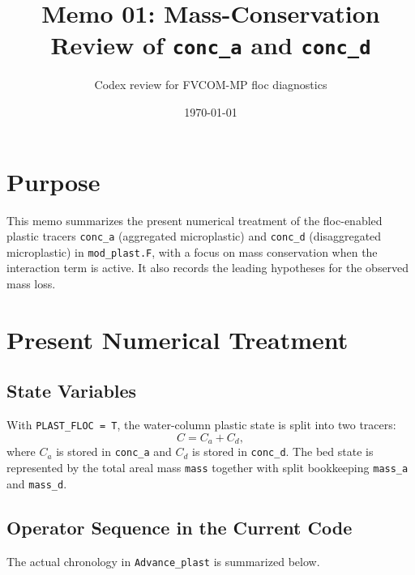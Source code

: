 \documentclass[11pt]{article}
\title{Memo 01: Mass-Conservation Review of \texttt{conc\_a} and \texttt{conc\_d}}
\author{Codex review for FVCOM-MP floc diagnostics}
\date{\today}
\begin{document}
\maketitle

\section{Purpose}
This memo summarizes the present numerical treatment of the floc-enabled plastic tracers
\texttt{conc\_a} (aggregated microplastic) and \texttt{conc\_d} (disaggregated microplastic)
in \texttt{mod\_plast.F}, with a focus on mass conservation when the interaction term is active.
It also records the leading hypotheses for the observed mass loss.

\section{Present Numerical Treatment}
\subsection{State Variables}
With \texttt{PLAST\_FLOC = T}, the water-column plastic state is split into two tracers:
\[
C = C_a + C_d,
\]
where $C_a$ is stored in \texttt{conc\_a} and $C_d$ is stored in \texttt{conc\_d}. The bed
state is represented by the total areal mass \texttt{mass} together with split bookkeeping
\texttt{mass\_a} and \texttt{mass\_d}.

\subsection{Operator Sequence in the Current Code}
The actual chronology in \texttt{Advance\_plast} is summarized below.
\end{document}
